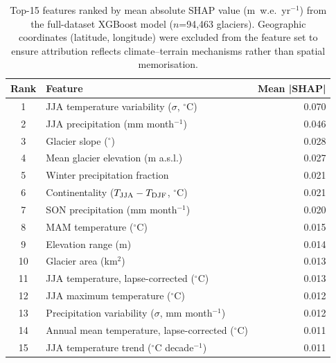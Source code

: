 \begin{table}[htbp]
\centering
\caption{Top-15 features ranked by mean absolute SHAP value (m~w.e.~yr$^{-1}$) from the full-dataset XGBoost model ($n$=94,463 glaciers). Geographic coordinates (latitude, longitude) were excluded from the feature set to ensure attribution reflects climate--terrain mechanisms rather than spatial memorisation.}
\label{tab:shap_importance}
\begin{tabular}{clr}
\hline
Rank & Feature & Mean |SHAP| \\
\hline
1 & JJA temperature variability ($\sigma$, $^{\circ}$C) & 0.070 \\
2 & JJA precipitation (mm month$^{-1}$) & 0.046 \\
3 & Glacier slope ($^{\circ}$) & 0.028 \\
4 & Mean glacier elevation (m a.s.l.) & 0.027 \\
5 & Winter precipitation fraction & 0.021 \\
6 & Continentality ($T_{\rm JJA} - T_{\rm DJF}$, $^{\circ}$C) & 0.021 \\
7 & SON precipitation (mm month$^{-1}$) & 0.020 \\
8 & MAM temperature ($^{\circ}$C) & 0.015 \\
9 & Elevation range (m) & 0.014 \\
10 & Glacier area (km$^2$) & 0.013 \\
11 & JJA temperature, lapse-corrected ($^{\circ}$C) & 0.013 \\
12 & JJA maximum temperature ($^{\circ}$C) & 0.012 \\
13 & Precipitation variability ($\sigma$, mm month$^{-1}$) & 0.012 \\
14 & Annual mean temperature, lapse-corrected ($^{\circ}$C) & 0.011 \\
15 & JJA temperature trend ($^{\circ}$C decade$^{-1}$) & 0.011 \\
\hline
\end{tabular}
\end{table}